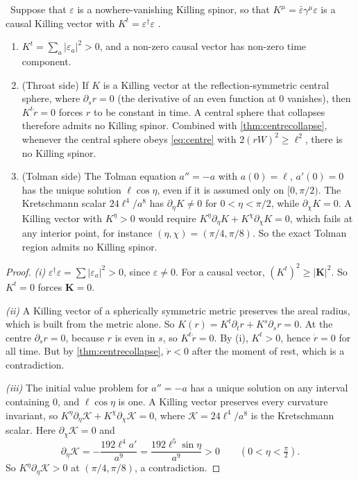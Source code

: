 \begin{theorem}\label{thm:nokilling}\ver\
Suppose that $\varepsilon$ is a nowhere-vanishing Killing spinor, so that $K^\mu=\bar\varepsilon\gamma^\mu\varepsilon$ is a causal Killing vector with $K^t=\varepsilon^\dagger\varepsilon$ \ext.
\begin{enumerate}[label=(\roman*)]
\item $K^t=\sum_a|\varepsilon_a|^2>0$, and a non-zero causal vector has non-zero time component.
\item (Throat side) If $K$ is a Killing vector at the reflection-symmetric central sphere, where $\partial_sr=0$ (the derivative of an even function at $0$ vanishes), then $K^t\dot r=0$ forces $r$ to be constant in time. A central sphere that collapses therefore admits no Killing spinor. Combined with \cref{thm:centrecollapse}, whenever the central sphere obeys \eqref{eq:centre} with $2(rW)^2\ge\ell^2$, there is no Killing spinor.
\item (Tolman side) The Tolman equation $a''=-a$ with $a(0)=\ell$, $a'(0)=0$ has the unique solution $\ell\cos\eta$, even if it is assumed only on $[0,\pi/2)$. The Kretschmann scalar $24\ell^4/a^8$ has $\partial_\eta K\ne0$ for $0<\eta<\pi/2$, while $\partial_\chi K=0$. A Killing vector with $K^\eta>0$ would require $K^\eta\partial_\eta K+K^\chi\partial_\chi K=0$, which fails at any interior point, for instance $(\eta,\chi)=(\pi/4,\pi/8)$. So the exact Tolman region admits no Killing spinor.
\end{enumerate}
\end{theorem}
\begin{proof}
\emph{(i)} $\varepsilon^\dagger\varepsilon=\sum|\varepsilon_a|^2>0$, since $\varepsilon\ne0$. For a causal vector, $(K^t)^2\ge|\mathbf K|^2$. So $K^t=0$ forces $\mathbf K=0$.

\emph{(ii)} A Killing vector of a spherically symmetric metric preserves the areal radius, which is built from the metric alone. So $K(r)=K^t\partial_tr+K^s\partial_sr=0$. At the centre $\partial_sr=0$, because $r$ is even in $s$, so $K^t\dot r=0$. By (i), $K^t>0$, hence $\dot r=0$ for all time. But by \cref{thm:centrecollapse}, $\dot r<0$ after the moment of rest, which is a contradiction.

\emph{(iii)} The initial value problem for $a''=-a$ has a unique solution on any interval containing $0$, and $\ell\cos\eta$ is one. A Killing vector preserves every curvature invariant, so $K^\eta\partial_\eta\mathcal K+K^\chi\partial_\chi\mathcal K=0$, where $\mathcal K=24\ell^4/a^8$ is the Kretschmann scalar. Here $\partial_\chi\mathcal K=0$ and
\[
\partial_\eta\mathcal K=-\frac{192\ell^4a'}{a^9}=\frac{192\ell^5\sin\eta}{a^9}>0\qquad(0<\eta<\tfrac\pi2).
\]
So $K^\eta\partial_\eta\mathcal K>0$ at $(\pi/4,\pi/8)$, a contradiction.
\end{proof}



